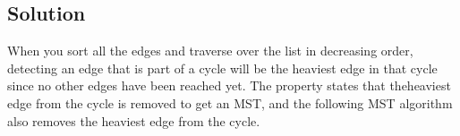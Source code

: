 \subsection*{Solution}

When you sort all the edges and traverse over the list in decreasing order, detecting an edge that is part of a cycle will be the heaviest edge in that cycle since no other edges have been reached yet. The property states that theheaviest edge from the cycle is removed to get an MST, and the following MST algorithm also removes the heaviest edge from the cycle.
